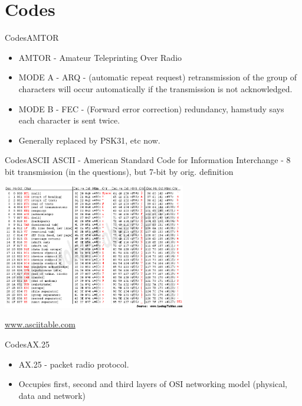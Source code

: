 \documentclass{beamer}
\begin{document}
\section{Codes}
\begin{frame}{Codes}{AMTOR}
\begin{itemize}
\item AMTOR - Amateur Teleprinting Over Radio
\item MODE A - ARQ - (automatic repeat request) retransmission of the group of characters will occur automatically if the transmission is not acknowledged.
\item MODE B - FEC - (Forward error correction) redundancy, hamstudy says each character is sent twice.
\item Generally replaced by PSK31, etc now.
\end{itemize}
\end{frame}
\begin{frame}{Codes}{ASCII}
ASCII - American Standard Code for Information Interchange - 8 bit transmission (in the questions), but 7-bit by orig. definition
\begin{centering}
\includegraphics[width=0.6\textwidth]{images/asciifull.png}

\tiny{\url{www.asciitable.com}}
\end{centering}
\end{frame}

\begin{frame}{Codes}{AX.25}
\begin{itemize}
\item AX.25 - packet radio protocol.
\item Occupies first, second and third layers of OSI networking model (physical, data and network)
\end{itemize}
\end{frame}
\end{document}
